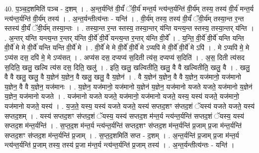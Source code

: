 \documentclass[17pt]{extarticle}
\begin{document}
40. प॒ञ्च॒द॒शमिति॑ पञ्च - द॒शम् । . अ॒न्त॒र्यन्ति॑ वी॒र्यं॑ ॅवी॒र्य॑ मन्त॒र्य न्त्य॑न्त॒र्यन्ति॑ वी॒र्य॑म् तस्य॒ तस्य॑ वी॒र्य॑ मन्त॒र्य न्त्य॑न्त॒र्यन्ति॑ वी॒र्य॑म् तस्य॑ । . अ॒न्त॒र्यन्तीत्य॑न्तः - यन्ति॑ । . वी॒र्य॑म् तस्य॒ तस्य॑ वी॒र्यं॑ ॅवी॒र्य॑म् तस्या॒न्त र॒न्त स्तस्य॑ वी॒र्यं॑ ॅवी॒र्य॑म् तस्या॒न्तः । . तस्या॒न्त र॒न्त स्तस्य॒ तस्या॒न्तर् य॑न्ति यन्त्य॒न्त स्तस्य॒ तस्या॒न्तर् य॑न्ति । . अ॒न्तर् य॑न्ति यन्त्य॒न्त र॒न्तर् य॑न्ति वी॒र्ये॑ वी॒र्ये॑ यन्त्य॒न्त र॒न्तर् य॑न्ति वी॒र्ये᳚ । . य॒न्ति॒ वी॒र्ये॑ वी॒र्ये॑ यन्ति यन्ति वी॒र्ये॑ मे मे वी॒र्ये॑ यन्ति यन्ति वी॒र्ये॑ मे । . वी॒र्ये॑ मे मे वी॒र्ये॑ वी॒र्ये॑ मे ऽप्यपि॑ मे वी॒र्ये॑ वी॒र्ये॑ मे ऽपि॑ । . मे ऽप्यपि॑ मे॒ मे ऽप्य॑स दस॒ दपि॑ मे॒ मे ऽप्य॑सत् । . अप्य॑स दस॒ दप्यप्य॑ स॒दिती त्य॑स॒ दप्यप्य॑ स॒दिति॑ । . अ॒स॒ दिती त्य॑सद स॒दिति॒ खलु॒ खल्वि त्य॑स दस॒ दिति॒ खलु॑ । . इति॒ खलु॒ खल्वितीति॒ खलु॒ वै वै खल्वितीति॒ खलु॒ वै । . खलु॒ वै वै खलु॒ खलु॒ वै य॒ज्ञेन॑ य॒ज्ञेन॒ वै खलु॒ खलु॒ वै य॒ज्ञेन॑ । . वै य॒ज्ञेन॑ य॒ज्ञेन॒ वै वै य॒ज्ञेन॒ यज॑मानो॒ यज॑मानो य॒ज्ञेन॒ वै वै य॒ज्ञेन॒ यज॑मानः । . य॒ज्ञेन॒ यज॑मानो॒ यज॑मानो य॒ज्ञेन॑ य॒ज्ञेन॒ यज॑मानो यजते यजते॒ यज॑मानो य॒ज्ञेन॑ य॒ज्ञेन॒ यज॑मानो यजते । . यज॑मानो यजते यजते॒ यज॑मानो॒ यज॑मानो यजते॒ यस्य॒ यस्य॑ यजते॒ यज॑मानो॒ यज॑मानो यजते॒ यस्य॑ । . य॒ज॒ते॒ यस्य॒ यस्य॑ यजते यजते॒ यस्य॑ सप्तद॒शꣳ स॑प्तद॒शं ॅयस्य॑ यजते यजते॒ यस्य॑ सप्तद॒शम् । . यस्य॑ सप्तद॒शꣳ स॑प्तद॒शं ॅयस्य॒ यस्य॑ सप्तद॒श म॑न्त॒र्य न्त्य॑न्त॒र्यन्ति॑ सप्तद॒शं ॅयस्य॒ यस्य॑ सप्तद॒श म॑न्त॒र्यन्ति॑ । . स॒प्त॒द॒श म॑न्त॒र्य न्त्य॑न्त॒र्यन्ति॑ सप्तद॒शꣳ स॑प्तद॒श म॑न्त॒र्यन्ति॑ प्र॒जाम् प्र॒जा म॑न्त॒र्यन्ति॑ सप्तद॒शꣳ स॑प्तद॒श म॑न्त॒र्यन्ति॑ प्र॒जाम् । . स॒प्त॒द॒शमिति॑ सप्त - द॒शम् । . अ॒न्त॒र्यन्ति॑ प्र॒जाम् प्र॒जा म॑न्त॒र्य न्त्य॑न्त॒र्यन्ति॑ प्र॒जाम् तस्य॒ तस्य॑ प्र॒जा म॑न्त॒र्य न्त्य॑न्त॒र्यन्ति॑ प्र॒जाम् तस्य॑ । . अ॒न्त॒र्यन्तीत्य॑न्तः - यन्ति॑ । \newline
\pagebreak
{}
\end{document}
